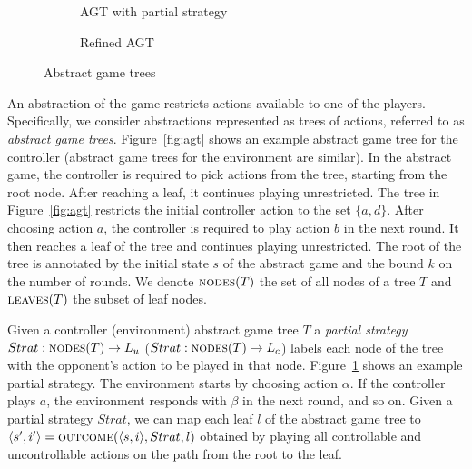 \documentclass{llncs}
\begin{document}
\begin{figure}
\begin{subfigure}[t]{.32\textwidth}
        \captionsetup{width=.8\textwidth}
        \caption{AGT with partial strategy}
        \label{fig:strategy}
    \end{subfigure}%
    \begin{subfigure}[t]{.32\textwidth}
        \centering
        \captionsetup{width=.8\textwidth}
        \caption{Refined AGT}
        \label{fig:refined}
    \end{subfigure}
    \caption{Abstract game trees}
    \label{fig:alltrees}
\end{figure}

An abstraction of the game restricts actions available to one of the players.
Specifically, we consider abstractions represented as trees of actions,
referred to as \emph{abstract game trees}.  Figure~\ref{fig:agt} shows an example abstract game
tree for the controller (abstract game trees for the environment are similar).  In the abstract game, 
the controller is required to pick actions
from the tree, starting from the root node.  After reaching a leaf, it
continues playing unrestricted.  The tree in Figure~\ref{fig:agt} restricts the
initial controller action to the set $\{a, d\}$.  After choosing action $a$,
the controller is required to play action $b$ in the next round.  It then reaches a leaf 
of the tree and continues playing unrestricted.
The root of the tree is annotated by the initial state $s$ of the abstract game and the 
bound $k$ on the number of rounds. 
We denote $\textsc{nodes}(T)$ the set of all nodes of a tree $T$ and
$\textsc{leaves}(T)$ the subset of leaf nodes.  

Given a controller (environment)
abstract game tree $T$ a \emph{partial strategy} $Strat: \textsc{nodes}(T) \rightarrow L_u$ 
($Strat: \textsc{nodes}(T) \rightarrow L_c$) labels each node of the tree with
the opponent's action to be played in that node.   Figure~\ref{fig:strategy}
shows an example partial strategy.  The environment starts by choosing action
$\alpha$.  If the controller plays $a$, the environment responds with $\beta$
in the next round, and so on. Given a partial strategy $Strat$, we can map each
leaf $l$ of the abstract game tree to $\langle
s',i'\rangle=\textsc{outcome}(\langle s, i\rangle, Strat, l)$ obtained by
playing all controllable and uncontrollable actions on the path from the root
to the leaf.
\end{document}
